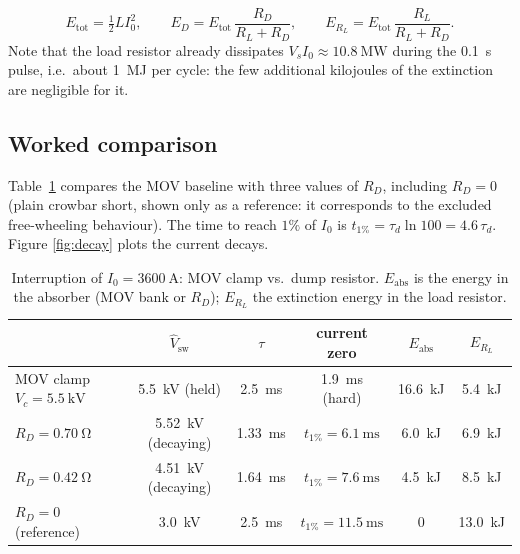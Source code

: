 \documentclass[11pt,a4paper]{article}
\begin{document}
\begin{equation}
E_{\mathrm{tot}} = \tfrac{1}{2}LI_0^2, \qquad
E_D = E_{\mathrm{tot}}\,\frac{R_D}{R_L+R_D}, \qquad
E_{R_L} = E_{\mathrm{tot}}\,\frac{R_L}{R_L+R_D}.
\end{equation}
Note that the load resistor already dissipates
$V_s I_0 \approx \SI{10.8}{\mega\watt}$ during the \SI{0.1}{\second} pulse,
i.e.\ about \SI{1}{\mega\joule} per cycle: the few additional kilojoules of
the extinction are negligible for it.

\subsection{Worked comparison}

Table~\ref{tab:compare} compares the MOV baseline with three values of $R_D$,
including $R_D=0$ (plain crowbar short, shown only as a reference: it
corresponds to the excluded free-wheeling behaviour). The time to reach
$1\%$ of $I_0$ is $t_{1\%} = \tau_d \ln 100 = 4.6\,\tau_d$. Figure
\ref{fig:decay} plots the current decays.

\begin{table}[htb]
\centering
\caption{Interruption of $I_0=\SI{3600}{\ampere}$: MOV clamp vs.\ dump
resistor. $E_{\mathrm{abs}}$ is the energy in the absorber (MOV bank or
$R_D$); $E_{R_L}$ the extinction energy in the load resistor.}
\label{tab:compare}
\begin{tabular}{lccccc}
\toprule
 & $\hat V_{\mathrm{sw}}$ & $\tau$ & current zero & $E_{\mathrm{abs}}$ & $E_{R_L}$ \\
\midrule
MOV clamp $V_c=\SI{5.5}{\kilo\volt}$ & \SI{5.5}{\kilo\volt} (held) & \SI{2.5}{\milli\second} & \SI{1.9}{\milli\second} (hard) & \SI{16.6}{\kilo\joule} & \SI{5.4}{\kilo\joule} \\
$R_D = \SI{0.70}{\ohm}$ & \SI{5.52}{\kilo\volt} (decaying) & \SI{1.33}{\milli\second} & $t_{1\%}=\SI{6.1}{\milli\second}$ & \SI{6.0}{\kilo\joule} & \SI{6.9}{\kilo\joule} \\
$R_D = \SI{0.42}{\ohm}$ & \SI{4.51}{\kilo\volt} (decaying) & \SI{1.64}{\milli\second} & $t_{1\%}=\SI{7.6}{\milli\second}$ & \SI{4.5}{\kilo\joule} & \SI{8.5}{\kilo\joule} \\
$R_D = 0$ (reference) & \SI{3.0}{\kilo\volt} & \SI{2.5}{\milli\second} & $t_{1\%}=\SI{11.5}{\milli\second}$ & 0 & \SI{13.0}{\kilo\joule} \\
\bottomrule
\end{tabular}
\end{table}
\end{document}
